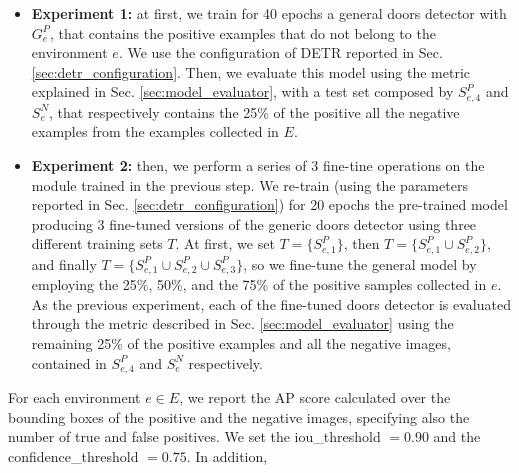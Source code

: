 \begin{itemize}
	\item \textbf{Experiment 1:} at first, we train for 40 epochs a general doors detector with $G^{P}_e$, that contains the positive examples that do not belong to the environment $e$. We use the configuration of DETR reported in Sec. \ref{sec:detr_configuration}. Then, we evaluate this model using the metric explained in Sec. \ref{sec:model_evaluator}, with a test set composed by $S^{P}_{e, 4}$ and $S^{N}_e$, that respectively contains the 25\% of the positive all the negative examples from the examples collected in $E$.
	
	\item \textbf{Experiment 2:} then, we perform a series of 3 fine-tine operations on the module trained in the previous step. We re-train (using the parameters reported in Sec. \ref{sec:detr_configuration}) for 20 epochs  the pre-trained model producing 3 fine-tuned versions of the generic doors detector using three different training sets $T$. At first, we set $ T= \big\{S^{P}_{e, 1}\big\}$, then $T=\big\{S^{P}_{e, 1} \cup S^{P}_{e, 2}\big\}$, and finally $T=\big\{S^{P}_{e, 1} \cup S^{P}_{e, 2} \cup S^{P}_{e, 3}\big\}$, so we fine-tune the general model by employing the  25\%, 50\%, and the 75\% of the positive samples collected in $e$. As the previous experiment, each of the fine-tuned doors detector is evaluated through the metric described in Sec. \ref{sec:model_evaluator} using the remaining 25\% of the positive examples and all the negative images, contained in $S^{P}_{e, 4}$ and $S^{N}_e$ respectively.

\end{itemize}

For each environment $e \in E$, we report the AP score calculated over the bounding boxes of the positive and the negative images, specifying also the number of true and false positives. We set the \textsf{iou\_threshold} $= 0.90$ and the \textsf{confidence\_threshold} $= 0.75$. In addition,  

